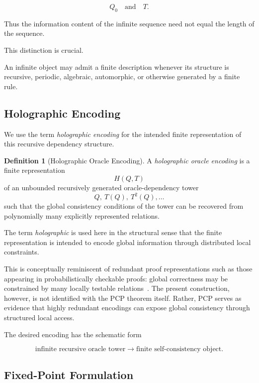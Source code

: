 \documentclass[11pt]{article}
\theoremstyle{plain}
\theoremstyle{definition}
\newtheorem{definition}[theorem]{Definition}
\begin{document}
\[
    Q_0
    \quad\text{and}\quad
    T.
\]

Thus the information content of the infinite sequence need not equal the
length of the sequence.

This distinction is crucial.

An infinite object may admit a finite description whenever its structure is
recursive, periodic, algebraic, automorphic, or otherwise generated by a
finite rule.

\subsection{Holographic Encoding}

We use the term \emph{holographic encoding} for the intended finite
representation of this recursive dependency structure.

\begin{definition}[Holographic Oracle Encoding]
\label{def:holographic-oracle-encoding}
A \emph{holographic oracle encoding} is a finite representation
\[
    H(Q,T)
\]
of an unbounded recursively generated oracle-dependency tower
\[
    Q,\ T(Q),\ T^2(Q),\dots
\]
such that the global consistency conditions of the tower can be recovered
from polynomially many explicitly represented relations.
\end{definition}

The term \emph{holographic} is used here in the structural sense that the
finite representation is intended to encode global information through
distributed local constraints.

This is conceptually reminiscent of redundant proof representations such as
those appearing in probabilistically checkable proofs: global correctness may
be constrained by many locally testable relations~\cite{AroraEtAl1998}.  The present construction,
however, is not identified with the PCP theorem itself.  Rather, PCP serves as
evidence that highly redundant encodings can expose global consistency through
structured local access.

The desired encoding has the schematic form

\[
    \boxed{
    \text{infinite recursive oracle tower}
    \longrightarrow
    \text{finite self-consistency object}.
    }
\]

\subsection{Fixed-Point Formulation}
\end{document}
